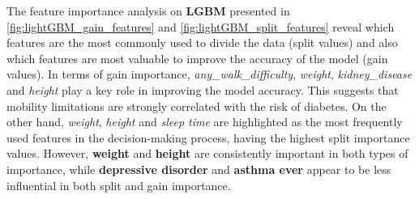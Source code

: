 \documentclass[runningheads]{llncs}
\begin{document}
The feature importance analysis on \textbf{LGBM} presented in \autoref{fig:lightGBM_gain_features} and \autoref{fig:lightGBM_split_features} reveal which features are the most commonly used to divide the data (split values) and also  which features are most valuable to improve the accuracy of the model (gain values).
In terms of gain importance, \textit{any\_walk\_difficulty}, \textit{weight}, \textit{kidney\_disease} and \textit{height} play a key role in improving the model accuracy. This suggests that mobility limitations are strongly correlated with the risk of diabetes. On the other hand, \textit{weight}, \textit{height} and \textit{sleep time} are highlighted as the most frequently used features in the decision-making process, having the highest split importance values. However, \textbf{weight} and \textbf{height} are consistently important in both types of importance, while \textbf{depressive disorder} and \textbf{asthma ever} appear to be less influential in both split and gain importance.
\end{document}
